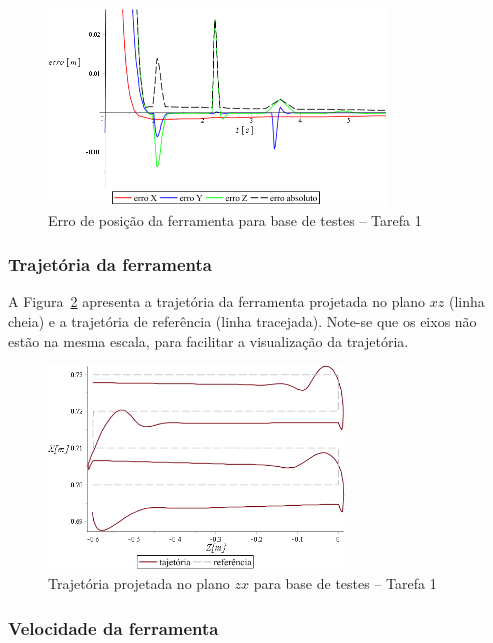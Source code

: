 \begin{figure}[h!]
	\centering 
 	\includegraphics[width=0.80\textwidth]{figs/t1_erroposf_base_testes}
 	\caption{Erro de posição da ferramenta para base de testes -- Tarefa 1}
 	\label{fig::t1_erroposf_base_testes}
\end{figure}


\subsubsection{Trajetória da ferramenta}

A Figura~\ref{fig::t1_traj_base_testes} apresenta a trajetória da ferramenta
projetada no plano $xz$ (linha cheia) e a trajetória de referência (linha
tracejada).
Note-se que os eixos não estão na mesma escala, para facilitar a visualização da
trajetória.

\begin{figure}[h!]
	\centering 
 	\includegraphics[width=0.70\textwidth]{figs/t1_traj_base_testes}
 	\caption{Trajetória projetada no plano $zx$ para base de testes -- Tarefa 1}
 	\label{fig::t1_traj_base_testes}
\end{figure}


\subsubsection{Velocidade da ferramenta}

